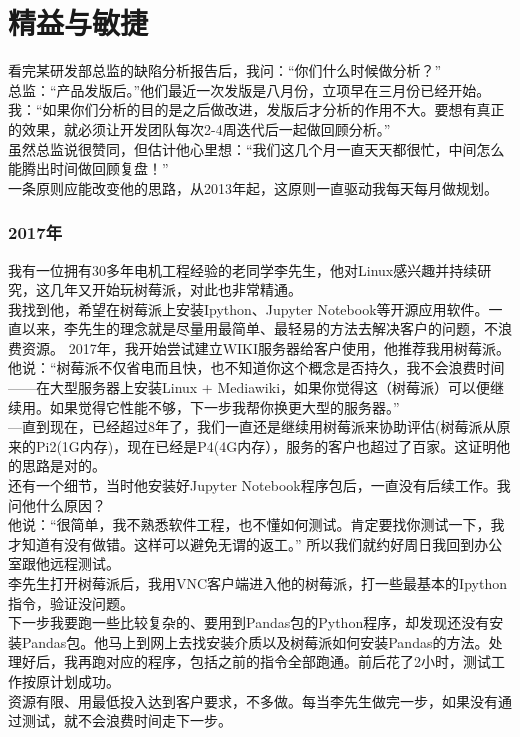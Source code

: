 \chapter{精益与敏捷} %

看完某研发部总监的缺陷分析报告后，我问：``你们什么时候做分析？''\\
总监：``产品发版后。''他们最近一次发版是八月份，立项早在三月份已经开始。\\
我：``如果你们分析的目的是之后做改进，发版后才分析的作用不大。要想有真正的效果，就必须让开发团队每次2-4周迭代后一起做回顾分析。''\\
虽然总监说很赞同，但估计他心里想：``我们这几个月一直天天都很忙，中间怎么能腾出时间做回顾复盘！''\\
一条原则应能改变他的思路，从2013年起，这原则一直驱动我每天每月做规划。

\hypertarget{ux5e74}{%
\subsection{2017年}\label{ux5e74}}

我有一位拥有30多年电机工程经验的老同学李先生，他对Linux感兴趣并持续研究，这几年又开始玩树莓派，对此也非常精通。\\
我找到他，希望在树莓派上安装Ipython、Jupyter
Notebook等开源应用软件。一直以来，李先生的理念就是尽量用最简单、最轻易的方法去解决客户的问题，不浪费资源。
2017年，我开始尝试建立WIKI服务器给客户使用，他推荐我用树莓派。\\
他说：``树莓派不仅省电而且快，也不知道你这个概念是否持久，我不会浪费时间------在大型服务器上安装Linux
+
Mediawiki，如果你觉得这（树莓派）可以便继续用。如果觉得它性能不够，下一步我帮你换更大型的服务器。''\\
---直到现在，已经超过8年了，我们一直还是继续用树莓派来协助评估(树莓派从原来的Pi2(1G内存)，现在已经是P4(4G内存），服务的客户也超过了百家。这证明他的思路是对的。\\
还有一个细节，当时他安装好Jupyter
Notebook程序包后，一直没有后续工作。我问他什么原因？\\
他说：``很简单，我不熟悉软件工程，也不懂如何测试。肯定要找你测试一下，我才知道有没有做错。这样可以避免无谓的返工。''
所以我们就约好周日我回到办公室跟他远程测试。\\
李先生打开树莓派后，我用VNC客户端进入他的树莓派，打一些最基本的Ipython指令，验证没问题。\\
下一步我要跑一些比较复杂的、要用到Pandas包的Python程序，却发现还没有安装Pandas包。他马上到网上去找安装介质以及树莓派如何安装Pandas的方法。处理好后，我再跑对应的程序，包括之前的指令全部跑通。前后花了2小时，测试工作按原计划成功。\\
资源有限、用最低投入达到客户要求，不多做。每当李先生做完一步，如果没有通过测试，就不会浪费时间走下一步。

